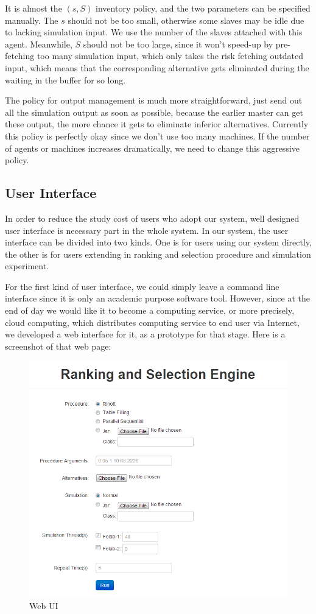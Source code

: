 It is almost the $(s, S)$ inventory policy, and the two parameters can be specified manually. The $s$ should not be too small, otherwise some slaves may be idle due to lacking simulation input. We use the number of the slaves attached with this agent. Meanwhile, $S$ should not be too large, since it won't speed-up by pre-fetching too many simulation input, which only takes the risk fetching outdated input, which means that the corresponding alternative gets eliminated during the waiting in the buffer for so long.

The policy for output management is much more straightforward, just send out all the simulation output as soon as possible, because the earlier master can get these output, the more chance it gets to eliminate inferior alternatives. Currently this policy is perfectly okay since we don't use too many machines. If the number of agents or machines increases dramatically, we need to change this aggressive policy.

\subsection{User Interface}

In order to reduce the study cost of users who adopt our system, well designed user interface is necessary part in the whole system. In our system, the user interface can be divided into two kinds. One is for users using our system directly, the other is for users extending in ranking and selection procedure and simulation experiment.

For the first kind of user interface, we could simply leave a command line interface since it is only an academic purpose software tool. However, since at the end of day we would like it to become a computing service, or more precisely, cloud computing, which distributes computing service to end user via Internet, we developed a web interface for it, as a prototype for that stage. Here is a screenshot of that web page:

\begin{figure}[ht] \label{web-ui}
\centering
\includegraphics[width=120mm]{rase_web.png}
\caption{Web UI}
\end{figure}

